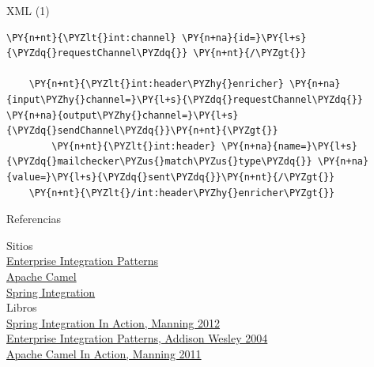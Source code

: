 \documentclass{beamer}
\begin{document}
\begin{frame}[fragile]{XML (1)}
\begin{Verbatim}[fontsize=\tiny,commandchars=\\\{\}]
    \PY{n+nt}{\PYZlt{}int:channel} \PY{n+na}{id=}\PY{l+s}{\PYZdq{}requestChannel\PYZdq{}} \PY{n+nt}{/\PYZgt{}}

    \PY{n+nt}{\PYZlt{}int:header\PYZhy{}enricher} \PY{n+na}{input\PYZhy{}channel=}\PY{l+s}{\PYZdq{}requestChannel\PYZdq{}} \PY{n+na}{output\PYZhy{}channel=}\PY{l+s}{\PYZdq{}sendChannel\PYZdq{}}\PY{n+nt}{\PYZgt{}}
        \PY{n+nt}{\PYZlt{}int:header} \PY{n+na}{name=}\PY{l+s}{\PYZdq{}mailchecker\PYZus{}match\PYZus{}type\PYZdq{}} \PY{n+na}{value=}\PY{l+s}{\PYZdq{}sent\PYZdq{}}\PY{n+nt}{/\PYZgt{}}
    \PY{n+nt}{\PYZlt{}/int:header\PYZhy{}enricher\PYZgt{}}
\end{Verbatim}
\end{frame}


\begin{frame}{Referencias}
\begin{center}
Sitios \\
\href{http://www.eaipatterns.com/}{Enterprise Integration Patterns} \\
\href{http://camel.apache.org/}{Apache Camel} \\
\href{http://projects.spring.io/spring-integration/}{Spring Integration} \\
Libros \\
\href{https://www.dropbox.com/s/gwa5p1edxpgudcz/Manning.Spring.Integration.in.Action.Sep.2012.pdf}{Spring Integration In Action, Manning 2012}  \\
\href{https://www.dropbox.com/s/zd9uft4ygbclehn/Addison.Wesley.Enterprise.Integration.Patterns.pdf}{Enterprise Integration Patterns, Addison Wesley 2004} \\
\href{https://www.dropbox.com/s/gjfegd85cvih78a/Manning.Camel.in.Action.Dec.2010.pdf}{Apache Camel In Action, Manning 2011}
\end{center}
\end{frame}
\end{document}
